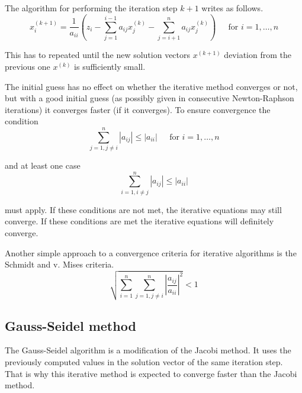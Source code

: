 \documentclass[10pt]{report}
\begin{document}
\addvspace{12pt}

The algorithm for performing the iteration step $k + 1$ writes as
follows.
\begin{equation}
x_{i}^{(k+1)} = \dfrac{1}{a_{ii}}\left(z_i - \sum_{j=1}^{i-1} a_{ij}x_{j}^{(k)} - \sum_{j=i+1}^{n} a_{ij}x_{j}^{(k)}\right)
\;\;\;\; \textrm{ for } i = 1, \ldots, n
\end{equation}

This has to repeated until the new solution vectors $x^{(k+1)}$
deviation from the previous one $x^{(k)}$ is sufficiently small.

\addvspace{12pt}

The initial guess has no effect on whether the iterative method
converges or not, but with a good initial guess (as possibly given in
consecutive Newton-Raphson iterations) it converges faster (if it
converges).  To ensure convergence the condition
\begin{equation}
\sum_{j = 1, j \ne i}^{n} \left|a_{ij}\right| \le \left|a_{ii}\right|
\;\;\;\; \textrm{ for } i = 1, \ldots, n
\end{equation}

and at least one case
\begin{equation}
\sum_{i = 1, i \ne j}^{n} \left|a_{ij}\right| \le \left|a_{ii}\right|
\end{equation}

must apply.  If these conditions are not met, the iterative equations
may still converge.  If these conditions are met the iterative
equations will definitely converge.

\addvspace{12pt}

Another simple approach to a convergence criteria for iterative
algorithms is the Schmidt and v. Mises criteria.
\begin{equation}
\sqrt{\sum_{i = 1}^n \sum_{j = 1, j \ne i}^n \left|\dfrac{a_{ij}}{a_{ii}}\right|^2} < 1
\end{equation}

\subsection{Gauss-Seidel method}

The Gauss-Seidel algorithm is a modification of the Jacobi method.  It
uses the previously computed values in the solution vector of the same
iteration step.  That is why this iterative method is expected to
converge faster than the Jacobi method.
\end{document}
